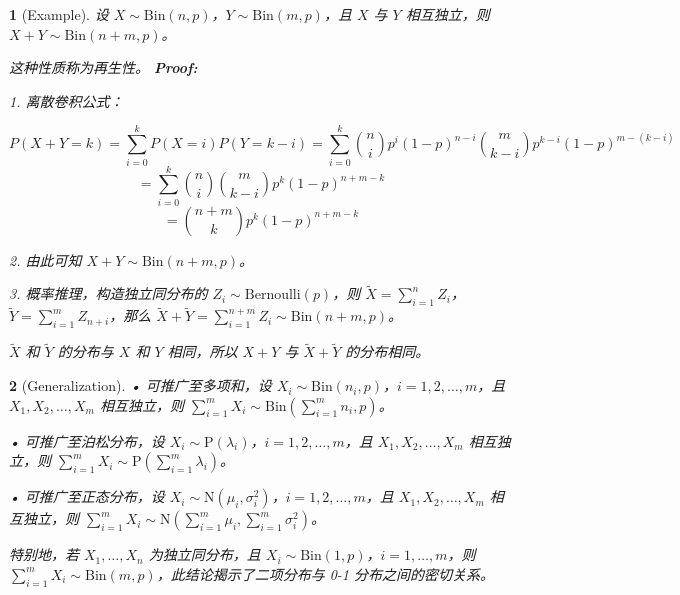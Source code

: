 \documentclass[UTF8]{report}
\theoremstyle{MyLineTheoremStyle} %
\theoremstyle{MyBlockTheoremStyle} %
\theoremstyle{MySubsubsectionStyle} %
\newtheorem{definition}{}
\begin{document}
\begin{definition}[Example]
    设 $X \sim \text{Bin}(n,p)$，$Y \sim \text{Bin}(m,p)$，且 $X$ 与 $Y$ 相互独立，则 $X+Y \sim \text{Bin}(n+m,p)$。\par
    这种性质称为再生性。
    \textbf{Proof:}\par
    1. 离散卷积公式：\par
    \[
    P(X+Y=k) = \sum_{i=0}^{k} P(X=i) P(Y=k-i) = \sum_{i=0}^{k} \binom{n}{i} p^{i} (1-p)^{n-i} \binom{m}{k-i} p^{k-i} (1-p)^{m-(k-i)}
    \]
    \[
    = \sum_{i=0}^{k} \binom{n}{i} \binom{m}{k-i} p^{k} (1-p)^{n+m-k}
    \]
    \[
    = \binom{n+m}{k} p^{k} (1-p)^{n+m-k}
    \]\par
    2. 由此可知 $X+Y \sim \text{Bin}(n+m,p)$。\par
    3. 概率推理，构造独立同分布的 $Z_i \sim \text{Bernoulli}(p)$，则 $\tilde{X} = \sum_{i=1}^{n} Z_i$，$\tilde{Y} = \sum_{i=1}^{m} Z_{n+i}$，那么 $\tilde{X}+\tilde{Y} = \sum_{i=1}^{n+m} Z_i \sim \text{Bin}(n+m,p)$。\par
    $\tilde{X}$ 和 $\tilde{Y}$ 的分布与 $X$ 和 $Y$ 相同，所以 $X+Y$ 与 $\tilde{X}+\tilde{Y}$ 的分布相同。
\end{definition}

\begin{definition}[Generalization]
    • 可推广至多项和，设 $X_i \sim \text{Bin}(n_i, p)$，$i=1,2,\ldots,m$，且 $X_1, X_2, \ldots, X_m$ 相互独立，则 $\sum_{i=1}^{m} X_i \sim \text{Bin}(\sum_{i=1}^{m} n_i, p)$。\par
    • 可推广至泊松分布，设 $X_i \sim \text{P}(\lambda_i)$，$i=1,2,\ldots,m$，且 $X_1, X_2, \ldots, X_m$ 相互独立，则 $\sum_{i=1}^{m} X_i \sim \text{P}(\sum_{i=1}^{m} \lambda_i)$。\par
    • 可推广至正态分布，设 $X_i \sim \text{N}(\mu_i, \sigma_i^2)$，$i=1,2,\ldots,m$，且 $X_1, X_2, \ldots, X_m$ 相互独立，则 $\sum_{i=1}^{m} X_i \sim \text{N}(\sum_{i=1}^{m} \mu_i, \sum_{i=1}^{m} \sigma_i^2)$。\par
      特别地，若 $X_1, \ldots, X_n$ 为独立同分布，且 $X_i \sim \text{Bin}(1, p)$，$i=1, \ldots, m$，则 $\sum_{i=1}^{m} X_i \sim \text{Bin}(m, p)$，此结论揭示了二项分布与 0-1 分布之间的密切关系。
\end{definition}
\end{document}
